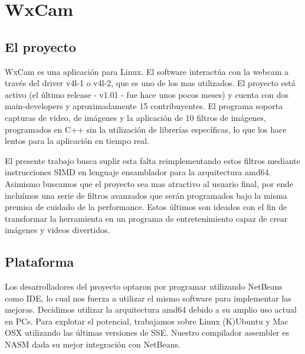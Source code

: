 \section{WxCam}

\subsection{El proyecto}
WxCam es una aplicaci\'on para Linux. El software interact\'ua con la webcam a trav\'es del driver v4l-1 o v4l-2, que es uno de los mas utilizados. El proyecto est\'a activo (el \'ultimo release - v1.01 - fue hace unos pocos meses) y cuenta con dos main-developers y aproximadamente 15 contribuyentes. El programa soporta capturas de video, de im\'agenes y la aplicaci\'on de 10 filtros de im\'agenes, programados en C++ sin la utilizaci\'on de librer\'ias espec\'ificas, lo que los hace lentos para la aplicaci\'on en tiempo real.

El presente trabajo busca suplir esta falta reimplementando estos filtros mediante instrucciones SIMD en lenguaje ensamblador para la arquitectura amd64. Asimismo buscamos que el proyecto sea mas atractivo al usuario final, por ende inclu\'imos una serie de filtros avanzados que ser\'an programados bajo la misma premisa de cuidado de la performance. Estos \'ultimos son ideados con el fin de transformar la herramienta en un programa de entretenimiento capaz de crear im\'agenes y videos divertidos.

\subsection{Plataforma}
Los desarrolladores del proyecto optaron por programar utilizando NetBeans como IDE, lo cual nos fuerza a utilizar el mismo software para implementar las mejoras. Decidimos utilizar la arquitectura amd64 debido a su amplio uso actual en PCs. Para explotar el potencial, trabajamos sobre Linux (K)Ubuntu y Mac OSX utilizando las \'ultimas versiones de SSE. Nuestro compilador assembler es NASM dada su mejor integraci\'on con NetBeans.

